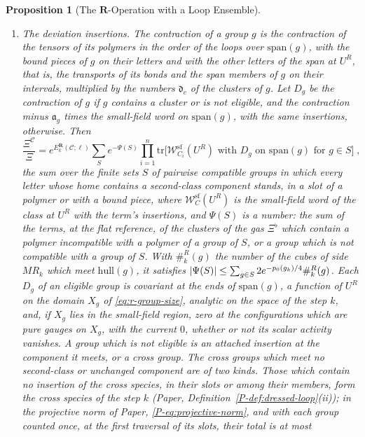\documentclass[11pt]{preprint}
\DeclarePairedDelimiter{\abs}{\lvert}{\rvert}
\numberwithin{equation}{section}
\newtheorem{proposition}{Proposition}
\theoremstyle{definition}
\theoremstyle{remark}
\theoremstyle{plain}
\begin{document}
\begin{proposition}[The $\mathbf R$-Operation with a Loop Ensemble]
\begin{enumerate}[label=(\roman*)]
\begin{enumerate}[label=(\alph*)]
\item the cross constant $E^{\mathbf R\times}_k \coloneqq E^{\mathbf R}_k(\mathcal C; \ell_0) - \sum_iE^{\mathbf R}_k(C_i; \ell_0)$ is a number which does not depend on the labelled term, it vanishes for a single loop, and $\abs{E^{\mathbf R\times}_k} \leq C^{\mathbf R\times}_EP_k(\mathcal C)e^{-p_0(g_k)/4}e^{-\kappa a_k/(6MR_k)}$, with a constant $C^{\mathbf R\times}_E$ of $d$, $\kappa$, and $\beta$.
\end{enumerate}
\item \emph{The deviation insertions.} The \emph{contraction} of a group $g$ is the contraction of the tensors of its polymers in the order of the loops over $\mathrm{span}(g)$, with the bound pieces of $g$ on their letters and with the other letters of the span at $U^R$, that is, the transports of its bonds and the span members of $g$ on their intervals, multiplied by the numbers $\mathfrak d_c$ of the clusters of $g$. Let $D_g$ be the contraction of $g$ if $g$ contains a cluster or is not eligible, and the contraction minus $\mathfrak a_g$ times the small-field word on $\mathrm{span}(g)$, with the same insertions, otherwise. Then
\begin{equation}\label{eq:marked-groups}
    \frac{\Xi^{\mathcal C}}{\Xi} = e^{E^{\mathbf R}_k(\mathcal C; \ell)}\sum_Se^{-\Psi(S)}\prod_{i=1}^n\mathrm{tr}\bigl[\mathcal W^{\mathrm{sf}}_{C_i}(U^R)\text{ with } D_g \text{ on } \mathrm{span}(g) \text{ for } g \in S\bigr]\;,
\end{equation}
the sum over the finite sets $S$ of pairwise compatible groups in which every letter whose home contains a second-class component stands, in a slot of a polymer or with a bound piece, where $\mathcal W^{\mathrm{sf}}_C(U^R)$ is the small-field word of the class at $U^R$ with the term's insertions, and $\Psi(S)$ is a number: the sum of the terms, at the flat reference, of the clusters of the gas $\Xi^\flat$ which contain a polymer incompatible with a polymer of a group of $S$, or a group which is not compatible with a group of $S$. With $\#^R_k(g)$ the number of the cubes of side $MR_k$ which meet $\mathrm{hull}(g)$, it satisfies $\abs{\Psi(S)} \leq \sum_{g \in S}2e^{-p_0(g_k)/4}\#^R_k(g)$. Each $D_g$ of an eligible group is covariant at the ends of $\mathrm{span}(g)$, a function of $U^R$ on the domain $X_g$ of \eqref{eq:r-group-size}, analytic on the space of the step $k$, and, if $X_g$ lies in the small-field region, zero at the configurations which are pure gauges on $X_g$, with the current $0$, whether or not its scalar activity vanishes. A group which is not eligible is an attached insertion at the component it meets, or a cross group. The cross groups which meet no second-class or unchanged component are of two kinds. Those which contain no insertion of the cross species, in their slots or among their members, form the cross species of the step $k$ (Paper, Definition~\ref{P-def:dressed-loop}(ii)); in the projective norm of Paper, \eqref{P-eq:projective-norm}, and with each group counted once, at the first traversal of its slots, their total is at most

\end{enumerate}
\end{proposition}
\end{document}
